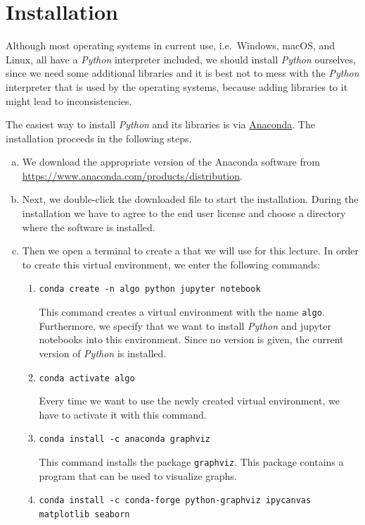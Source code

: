 \section{Installation}
Although most operating systems in current use, i.e.~Windows, macOS, and Linux, all have a \textsl{Python}
interpreter included, we should install \textsl{Python} ourselves, since we need some additional libraries and it is best
not to mess with the \textsl{Python} interpreter that is used by the operating systems, because adding
libraries to it might lead to inconsistencies.

The easiest way to install \textsl{Python} and its libraries is via \href{https://www.anaconda.com/download/}{Anaconda}.
The installation proceeds in the following steps.
\begin{enumerate}[(a)]
\item We download the appropriate version of the Anaconda software from
      \\[0.2cm]
      \hspace*{1.3cm}
      \href{https://www.anaconda.com/products/distribution}{https://www.anaconda.com/products/distribution}.
\item Next, we double-click the downloaded file to start the installation.  During the installation we have to
      agree to the end user license and choose a directory where the software is installed.
\item Then we open a terminal to create a  that we will use for this lecture.
      In order to create this virtual environment, we enter the following commands:
      \begin{enumerate}
      \item \texttt{conda create -n algo python jupyter notebook}

            This command creates a virtual environment with the name \texttt{algo}.  Furthermore, we specify
            that we want to install \textsl{Python} and jupyter notebooks into this environment.  Since no
            version is given, the current version of \textsl{Python} is installed.
      \item \texttt{conda activate algo}

            Every time we want to use the newly created virtual environment, we have to
            activate it with this command.
      \item \texttt{conda install -c anaconda graphviz}

            This command installs the package \texttt{graphviz}.  This package contains a program that
            can be used to visualize graphs.
      \item \texttt{conda install -c conda-forge python-graphviz ipycanvas matplotlib seaborn}


\end{enumerate}
\end{enumerate}
